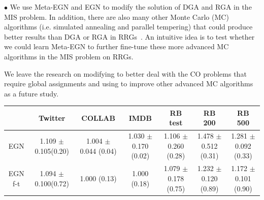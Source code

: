 $\bullet$ We use Meta-EGN and EGN to modify the solution of DGA and RGA in the MIS problem. In addition, there are also many other Monte Carlo (MC) algorithms (i.e. simulated annealing and parallel tempering) that could produce better results than DGA or RGA in RRGs~\citep{angelini2022cracking}. An intuitive idea is to test whether we could learn Meta-EGN to further fine-tune these more advanced MC algorithms in the MIS problem on RRGs. 

We leave the research on modifying \proj to better deal with the CO problems that require global assignments and using \proj to improve other advanced MC algorithms as a future study.




\iffalse
\begin{table}[]
\fontsize{6}{8}\selectfont
\setlength\tabcolsep{3pt}
    \begin{minipage}{1.00 \linewidth}
     \centering
     \begin{tabular}{@{}ccccccc@{}}
\toprule
                  & Twitter             & COLLAB  & IMDB    & RB test & RB 200 & RB 500 \\ \midrule
EGN               & 1.109 \hspace{-0.3mm}$\pm$\hspace{-0.3mm} 0.105(0.20) & 1.004 \hspace{-0.3mm}$\pm$\hspace{-0.3mm} 0.044 (0.04) & 1.030 \hspace{-0.3mm}$\pm$\hspace{-0.3mm} 0.170 (0.02) &     1.106 \hspace{-0.3mm}$\pm$\hspace{-0.3mm} 0.260 (0.28)    &    1.478 \hspace{-0.3mm}$\pm$\hspace{-0.3mm} 0.512 (0.31)    &    1.281 \hspace{-0.3mm}$\pm$\hspace{-0.3mm} 0.092 (0.33)    \\
EGN f-t           & 1.094 \hspace{-0.3mm}$\pm$\hspace{-0.3mm} 0.100(0.72) & 1.000 (0.13) & 1.000 (0.18) &    1.079 \hspace{-0.3mm}$\pm$\hspace{-0.3mm} 0.178 (0.75)     &    1.232 \hspace{-0.3mm}$\pm$\hspace{-0.3mm} 0.120 (0.89)    &    1.172 \hspace{-0.3mm}$\pm$\hspace{-0.3mm} 0.101 (0.90)    \\

\end{tabular}
\end{minipage}
\end{table}
